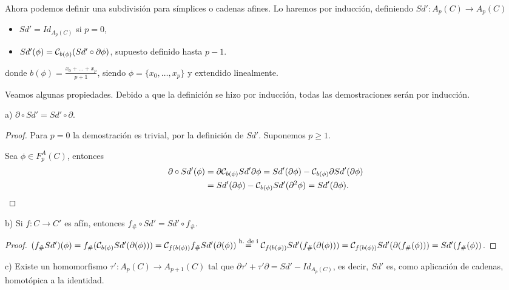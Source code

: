 Ahora podemos definir una subdivisión para símplices o cadenas afines. Lo haremos por inducción, definiendo ${Sd' \colon A_p(C) \to A_p(C)}$
\begin{itemize}
  \item $Sd' = Id_{A_p(C)}$ si $p = 0$,
  \item $Sd'(\phi) = {\mathcal C}_{b(\phi)}(Sd' \circ \partial \phi)$, supuesto definido hasta $p-1$.
\end{itemize}
donde $b(\phi) = \frac{x_0 + \dots + x_p}{p+1}$, siendo $\phi = \{x_0, \dots, x_p\}$ y extendido linealmente.

Veamos algunas propiedades. Debido a que la definición se hizo por inducción, todas las demostraciones serán por inducción.

a) $\partial \circ Sd' = Sd' \circ \partial$.

\begin{proof}
  Para $p = 0$ la demostración es trivial, por la definición de $Sd'$. Suponemos $p \geq 1$.

  Sea $\phi \in F_p^A(C)$, entonces
  \begin{align*}
    \partial \circ Sd'(\phi) &= \partial {\mathcal C}_{b(\phi)} Sd' \partial \phi = Sd'(\partial \phi) - {\mathcal C}_{b(\phi)} \partial Sd'(\partial \phi) \\
    &= Sd'(\partial \phi) - {\mathcal C}_{b(\phi)} Sd'(\partial^2 \phi) = Sd'(\partial \phi).
  \end{align*}
\end{proof}

b) Si $f \colon C \to C'$ es afín, entonces $f_\# \circ Sd' = Sd' \circ f_\#$.

\begin{proof}
  $(f_\# Sd')(\phi) = f_\#({\mathcal C}_{b(\phi)} Sd'(\partial(\phi))) = {\mathcal C}_{f(b(\phi))} f_\# Sd'(\partial(\phi))\\ \stackrel{\text{h. de i}}{=}
  {\mathcal C}_{f(b(\phi))} Sd'(f_\#(\partial(\phi))) = {\mathcal C}_{f(b(\phi))} Sd'(\partial(f_\#(\phi))) = Sd'(f_\#(\phi))$.
\end{proof}

c) Existe un homomorfismo $\tau' \colon A_p(C) \to A_{p+1}(C)$ tal que ${\partial \tau' + \tau' \partial = Sd' - Id_{A_p(C)}}$,
es decir, $Sd'$ es, como aplicación de cadenas, homotópica a la identidad.

